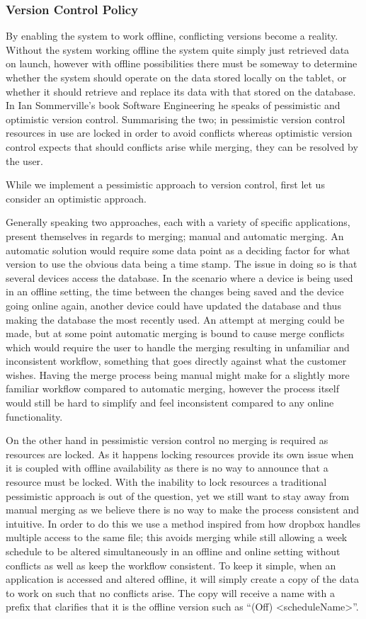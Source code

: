 \subsubsection*{Version Control Policy}
By enabling the system to work offline, conflicting versions become a reality.
Without the system working offline the system quite simply just retrieved data on launch, however with offline possibilities there must be someway to determine whether the system should operate on the data stored locally on the tablet, or whether it should retrieve and replace its data with that stored on the database.
In Ian Sommerville's book Software Engineering \citep{SEBOOK} he speaks of pessimistic and optimistic version control.
Summarising the two; in pessimistic version control resources in use are locked in order to avoid conflicts whereas optimistic version control expects that should conflicts arise while merging, they can be resolved by the user.

\bigskip \noindent
While we implement a pessimistic approach to version control, first let us consider an optimistic approach.

Generally speaking two approaches, each with a variety of specific applications, present themselves in regards to merging; manual and automatic merging.
An automatic solution would require some data point as a deciding factor for what version to use the obvious data being a time stamp.
The issue in doing so is that several devices access the database.
In the scenario where a device is being used in an offline setting, the time between the changes being saved and the device going online again, another device could have updated the database and thus making the database the most recently used.
An attempt at merging could be made, but at some point automatic merging is bound to cause merge conflicts which would require the user to handle the merging resulting in unfamiliar and inconsistent workflow, something that goes directly against what the customer wishes.
Having the merge process being manual might make for a slightly more familiar workflow compared to automatic merging, however the process itself would still be hard to simplify and feel inconsistent compared to any online functionality.
    
On the other hand in pessimistic version control no merging is required as resources are locked.
As it happens locking resources provide its own issue when it is coupled with offline availability as there is no way to announce that a resource must be locked.
With the inability to lock resources a traditional pessimistic approach is out of the question, yet we still want to stay away from manual merging as we believe there is no way to make the process consistent and intuitive.
In order to do this we use a method inspired from how dropbox handles multiple access to the same file; this avoids merging while still allowing a week schedule to be altered simultaneously in an offline and online setting without conflicts as well as keep the workflow consistent.
To keep it simple, when an application is accessed and altered offline, it will simply create a copy of the data to work on such that no conflicts arise.
The copy will receive a name with a prefix that clarifies that it is the offline version such as ``(Off) <scheduleName>''.
